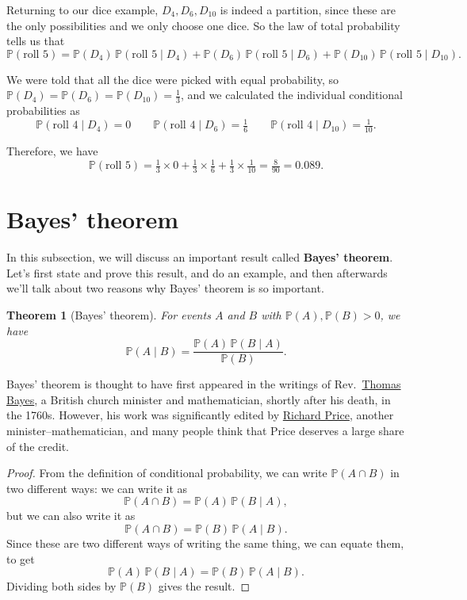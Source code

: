 \documentclass[
  a4paper,
]{book}
\newtheorem{theorem}{Theorem}[chapter]
\theoremstyle{definition}
\theoremstyle{definition}
\theoremstyle{definition}
\theoremstyle{definition}
\theoremstyle{remark}
\begin{document}
Returning to our dice example, \(D_4, D_6, D_{10}\) is indeed a partition, since these are the only possibilities and we only choose one dice. So the law of total probability tells us that
\[ \mathbb P(\text{roll 5}) = \mathbb P(D_4) \, \mathbb P(\text{roll 5} \mid D_4) +  \mathbb P(D_6) \, \mathbb P(\text{roll 5} \mid D_6) + \mathbb P(D_{10}) \, \mathbb P(\text{roll 5} \mid D_{10}) . \]

We were told that all the dice were picked with equal probability, so \(\mathbb P(D_4) = \mathbb P(D_6) = \mathbb P(D_{10}) = \frac13\), and we calculated the individual conditional probabilities as
\[ \mathbb P(\text{roll 4} \mid D_4) = 0 \qquad \mathbb P(\text{roll 4} \mid D_6) = \tfrac16 \qquad \mathbb P(\text{roll 4} \mid D_{10}) = \tfrac{1}{10} .  \]

Therefore, we have
\[ \mathbb P(\text{roll 5}) = \tfrac13\times 0 +  \tfrac13\times\tfrac16 +  \tfrac13\times\tfrac1{10} = \tfrac{8}{90} = 0.089. \]

\hypertarget{bayes}{%
\section{Bayes' theorem}\label{bayes}}

In this subsection, we will discuss an important result called \textbf{Bayes' theorem}.
Let's first state and prove this result, and do an example, and then afterwards we'll talk about two reasons why Bayes' theorem is so important.

\begin{theorem}[Bayes' theorem]
\protect\hypertarget{thm:thbayes}{}\label{thm:thbayes}For events \(A\) and \(B\) with \(\mathbb P(A), \mathbb P(B) > 0\), we have
\[ \mathbb P(A \mid B) = \frac{\mathbb P(A) \,\mathbb P(B \mid A)}{\mathbb P(B)} .  \]
\end{theorem}

Bayes' theorem is thought to have first appeared in the writings of Rev.~\href{https://mathshistory.st-andrews.ac.uk/Biographies/Bayes/}{Thomas Bayes}, a British church minister and mathematician, shortly after his death, in the 1760s. However, his work was significantly edited by \href{https://mathshistory.st-andrews.ac.uk/Biographies/Price/}{Richard Price}, another minister--mathematician, and many people think that Price deserves a large share of the credit.

\begin{proof}
From the definition of conditional probability, we can write \(\mathbb P(A \cap B)\) in two different ways: we can write it as
\[  \mathbb P(A \cap B) = \mathbb P(A) \, \mathbb P(B\mid A) , \]
but we can also write it as
\[  \mathbb P(A \cap B) = \mathbb P(B) \, \mathbb P(A\mid B) . \]
Since these are two different ways of writing the same thing, we can equate them, to get
\[ \mathbb P(A) \, \mathbb P(B\mid A) = \mathbb P(B) \, \mathbb P(A\mid B) . \]
Dividing both sides by \(\mathbb P(B)\) gives the result.
\end{proof}
\end{document}
